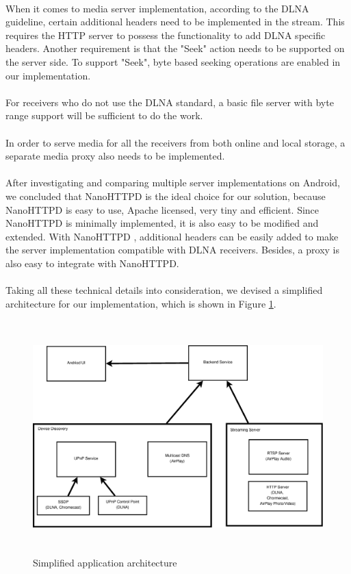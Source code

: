 \\
When it comes to media server implementation, according to the DLNA guideline,
certain additional headers need to be implemented in the stream. This
requires the HTTP server to possess the functionality to add DLNA specific
headers. Another requirement is that the "Seek" action needs to be supported on the server side. To support "Seek", byte based seeking operations are enabled in our implementation.\\
\\
For receivers who do not use the DLNA standard, a basic file server with byte range support will be sufficient to do the work.\\
\\
In order to serve media for all the receivers from both online and local storage, a separate media proxy also needs to be implemented.\\
\\
After investigating and comparing multiple server implementations on Android, we
concluded that NanoHTTPD is the ideal choice for our solution, because NanoHTTPD is easy to use,
Apache licensed, very tiny and efficient. Since NanoHTTPD is minimally implemented, it is also easy to be modified and extended. With NanoHTTPD , additional headers can be easily added to make the server implementation compatible with DLNA receivers. Besides, a proxy is also easy to integrate with  NanoHTTPD.\\
\\
Taking all these technical details into consideration, we devised a simplified
architecture for our implementation, which is shown in Figure \ref{chart3}.
\begin{figure}[htb]
\centering \includegraphics[height=9cm]{charts/chart3}
\caption{Simplified application architecture\label{chart3}}
\end{figure}\\
